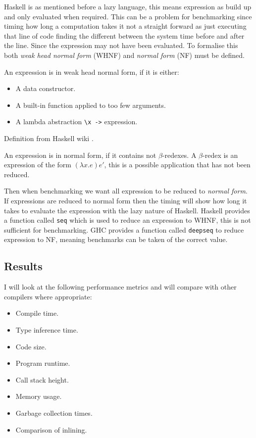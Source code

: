 \documentclass[float=false, crop=false]{standalone}
\begin{document}
Haskell is as mentioned before a lazy language, this means expression as build up and only
evaluated when required. This can be a problem for benchmarking since timing how long a
computation takes it not a straight forward as just executing that line
of code finding the different between the system time before and after the line. Since 
the expression may not have been evaluated. 
To formalise this both \textit{weak head normal form} (WHNF) and \textit{normal form} (NF) must be 
defined.
\begin{displayquote}
  An expression is in weak head normal form, if it is either:
  \begin{itemize}
    \item A data constructor.

    \item A built-in function applied to too few arguments.

    \item A lambda abstraction \verb|\x ->| expression.
  \end{itemize}
\end{displayquote}
Definition from Haskell wiki \cite{haskell-whnf}.
\begin{displayquote}
  An expression is in normal form, if it contains not $\beta$-redexes. A $\beta$-redex is an
  expression of the form $(\lambda x.e)e'$, this is a possible application that has not been reduced.
\end{displayquote}
Then when benchmarking we want all expression to be reduced to \textit{normal form}. If expressions
are reduced to normal form then the timing will show how long it takes to evaluate the expression
with the lazy nature of Haskell. Haskell provides a function called \verb|seq| which is used to 
reduce an expression to WHNF, this is not sufficient for benchmarking. GHC provides a function
called \verb|deepseq| to reduce expression to NF, meaning benchmarks can be taken of the 
correct value.

\subsection{Results}

I will look at the following performance metrics and will compare with other compilers where
appropriate:

\begin{itemize}
  \item Compile time.
  \item Type inference time.
  \item Code size.
  \item Program runtime.
  \item Call stack height.
  \item Memory usage.
  \item Garbage collection times.
  \item Comparison of inlining.
\end{itemize}
\end{document}
